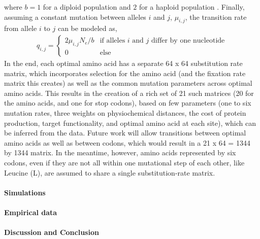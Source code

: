 \documentclass{article}
\newcommand{\Ne}{\ensuremath{{N_e}}\xspace}
\begin{document}
where $b=1$ for a diploid population and $2$ for a haploid population \cite{Iwasa88,BergAndLassig03,SellaAndHirsh05}.
Finally, assuming a constant mutation between alleles $i$ and $j$, $\mu_{i,j}$, the transition rate from allele $i$ to $j$ can be modeled as,
\begin{align*}
  q_{i,j} = \begin{cases} 2 \mu_{i,j} \Ne /b & \text{if alleles $i$ and $j$ differ by one nucleotide}\\
    0 & \text{else}
  \end{cases}
\end{align*}
In the end, each optimal amino acid has a separate 64 x 64 substitution rate matrix, which incorporates selection for the amino acid (and the fixation rate matrix this creates) as well as the common mutation parameters across optimal amino acids. 
This results in the creation of a rich set of 21 such matrices (20 for the amino acids, and one for stop codons), based on few parameters (one to six mutation rates, three weights on physiochemical distances, the cost of protein production, target functionality, and optimal amino acid at each site), which can be inferred from the data.
Future work will allow transitions between optimal amino acids as well as between codons, which would result in a 21 x 64 = 1344 by 1344 matrix. 
In the meantime, however, amino acids represented by six codons, even if they are not all within one mutational step of each other, like Leucine (L), are assumed to share a single substitution-rate matrix.


\paragraph*{Simulations}

\paragraph*{Empirical data}

\paragraph*{Discussion and Conclusion} %

\end{document}
